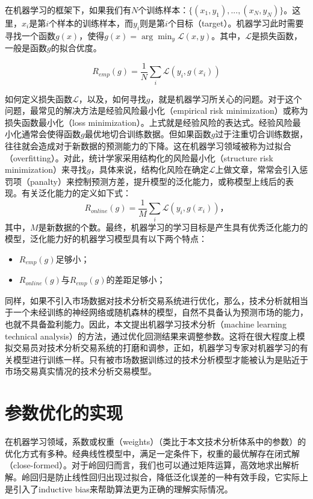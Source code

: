\documentclass[twoside,longtitle]{LZUthesis}
\begin{document}
在机器学习的框架下，如果我们有$N$个训练样本：$\{(x_1,y_1),...,(x_N,y_N)\}$。这里，$x_i$是第$i$个样本的训练样本，而$ y_i $则是第$ i $个目标（target）。机器学习此时需要寻找一个函数$ g(x) $，使得$ g(x)=\arg\min_y \mathcal{L}(x,y) $。其中，$ \mathcal{L} $是损失函数，一般是函数$g$的拟合优度。

\begin{equation}
R_{emp}(g)=\frac{1}{N}\sum_i \mathcal{L} (y_i, g(x_i))
\end{equation}

如何定义损失函数$\mathcal{L}$，以及，如何寻找$g$，就是机器学习所关心的问题。对于这个问题，最常见的解决方法是经验风险最小化（empirical risk minimization）或称为损失函数最小化（loss minimization）\cite{Vapnik2000The}。上式就是经验风险的表达式。经验风险最小化通常会使得函数$g$最优地切合训练数据。但如果函数$g$过于注重切合训练数据，往往就会造成对于新数据的预测能力的下降。这在机器学习领域被称为过拟合（overfitting）。对此，统计学家采用结构化的风险最小化（structure risk minimization）来寻找$g$，具体来说，结构化风险在确定$\mathcal{L}$上做文章，常常会引入惩罚项（panalty）来控制预测方差，提升模型的泛化能力，或称模型上线后的表现。有关泛化能力的定义如下式：
\begin{equation}
R_{online}(g)=\frac{1}{M}\sum_i \mathcal{L}(y_i, g(x_i))，
\end{equation}
其中，$M$是新数据的个数。最终，机器学习的学习目标是产生具有优秀泛化能力的模型，泛化能力好的机器学习模型具有以下两个特点：
\begin{itemize}
	\item $ R_{emp}(g) $足够小；
	\item $R_{online}(g)$与$ R_{emp}(g) $的差距足够小；
\end{itemize}

同样，如果不引入市场数据对技术分析交易系统进行优化，那么，技术分析就相当于一个未经训练的神经网络或随机森林的模型，自然不具备认为预测市场的能力，也就不具备盈利能力。因此，本文提出机器学习技术分析（machine learning technical analysis）的方法，通过优化回测结果来调整参数。这将在很大程度上模拟交易员对技术分析交易系统的打磨和调参，正如，机器学习专家对机器学习的有关模型进行训练一样。只有被市场数据训练过的技术分析模型才能被认为是贴近于市场交易真实情况的技术分析交易模型。

\section{参数优化的实现}
在机器学习领域，系数或权重（weights）（类比于本文技术分析体系中的参数）的优化方式有多种。经典线性模型中，满足一定条件下，权重的最优解存在闭式解（close-formed）。对于岭回归而言，我们也可以通过矩阵运算，高效地求出解析解。岭回归是防止线性回归出现过拟合，降低泛化误差的一种有效手段，它实际上是引入了inductive bias来帮助算法更为正确的理解实际情况。
\end{document}
